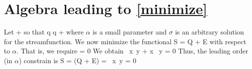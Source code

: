 \documentclass[11pt]{article}
\begin{document}
\clearpage

\appendix 
\section{Algebra leading to \eqref{minimize}}
Let
\beq
\psi \to \psi + \alpha \sigma \com
\eeq
so that
\beq
q \to q + \alpha \lap \sigma \com
\eeq
where $\alpha$ is a small parameter and $\sigma$ is an arbitrary solution for the streamfunction.
We now minimize the functional
\beq
S = Q + \mu E\com
\eeq
with respect to $\alpha$. That is, we require 
\beq
{} = 0\com {} \sigma\per
\eeq
We obtain
\beq
\iint {}\, \dd x\, \dd y + \alpha 
\iint {}\dd x \, \dd y = 0 \per
\eeq
Thus, the leading order (in $\alpha$) constrain is
\beq
\delta S = \delta (Q + \mu E) =  \iint {}\, \dd x\, \dd y = 0\per
\eeq


%
%
%
\end{document}
